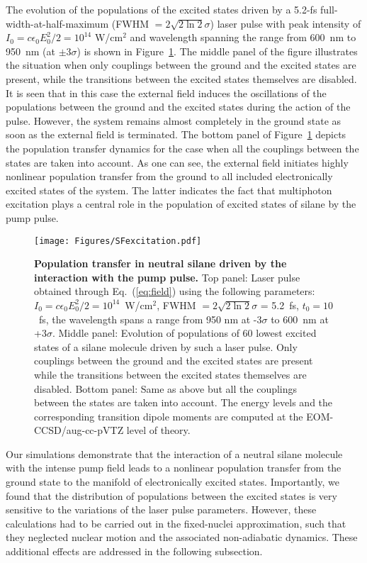 \documentclass[12pt]{article}
\begin{document}
The evolution of the populations of the excited states driven by a 5.2-fs full-width-at-half-maximum (FWHM $=2 \sqrt{2 \ln{2}}\sigma$) laser pulse with peak intensity of $I_0=c \epsilon_0 E_0^2/2= 10^{14}$ W/cm$^2$ and wavelength spanning the range from 600~nm to 950~nm (at $\pm 3\sigma$) is shown in Figure~\ref{pop_transf}. The middle panel of the figure illustrates the situation when only couplings between the ground and the excited states are present, while the transitions between the excited states themselves are disabled. It is seen that in this case the external field induces the oscillations of the populations between the ground and the excited states during the action of the pulse. However, the system remains almost completely in the ground state as soon as the external field is terminated. The bottom panel of Figure~\ref{pop_transf} depicts the population transfer dynamics for the case when all the couplings between the states are taken into account. As one can see, the external field initiates highly nonlinear population transfer from the ground to all included electronically excited states of the system. The latter indicates the fact that multiphoton excitation plays a central role in the population of excited states of silane by the pump pulse.

\begin{figure}[h!]
\centering
\texttt{[image: Figures/SFexcitation.pdf]}
\caption{\label{pop_transf}\textbf{Population transfer in neutral silane driven by the interaction with the pump pulse.} Top panel: Laser pulse obtained through Eq.~(\ref{eq:field}) using the following parameters: $I_0=c \epsilon_0 E_0^2/2= 10^{14}$~W/cm$^2$, FWHM $=2 \sqrt{2 \ln{2}}\sigma$ = 5.2~fs, $t_0 = 10$~fs, the wavelength spans a range from 950 nm at -3$\sigma$ to 600~nm at +3$\sigma$. Middle panel: Evolution of populations of 60 lowest excited states of a silane molecule driven by such a laser pulse. Only couplings between the ground and the excited states are present while the transitions between the excited states themselves are disabled. Bottom panel: Same as above but all the couplings between the states are taken into account. The energy levels and the corresponding transition dipole moments are computed at the EOM-CCSD/aug-cc-pVTZ level of theory.}
\end{figure}

Our simulations %
demonstrate that the interaction of a neutral silane molecule with the intense pump field leads to a nonlinear population transfer from the ground state to the manifold of electronically excited states. Importantly, we found that the distribution of populations between the excited states is very sensitive to the variations of the laser pulse parameters. However, these calculations had to be carried out in the fixed-nuclei approximation, such that they neglected nuclear motion and the associated non-adiabatic dynamics. These additional effects are addressed in the following subsection.
\end{document}
